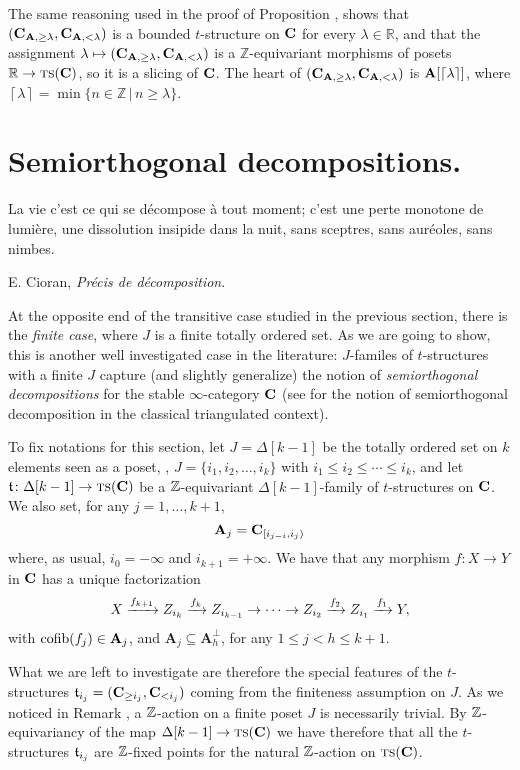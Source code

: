 \begin{remark}The same reasoning used in the proof of Proposition , shows that $(\textbf{C}_{\textbf{A},\geq \lambda}, \textbf{C}_{\textbf{A},<\lambda})$ is a bounded $t$-structure on $\textbf{C}$ for every $\lambda\in \mathbb{R}$, and that the assignment $\lambda\mapsto (\textbf{C}_{\textbf{A},\geq \lambda}, \textbf{C}_{\textbf{A},<\lambda})$ is a $\mathbb{Z}$-equivariant morphisms of posets $\mathbb{R}\to \textsc{ts}(\textbf{C})$, so it is a slicing of $\textbf{C}$. The heart of $(\textbf{C}_{\textbf{A},\geq \lambda}, \textbf{C}_{\textbf{A},<\lambda})$ is $\textbf{A}[\left \lceil{\lambda}\right \rceil]$, where $\left \lceil{\lambda}\right \rceil=\min\{n\in \mathbb{Z}\,|\, n\geq\lambda\}$.
\end{remark}
\section{Semiorthogonal decompositions.}
\setlength{\epigraphwidth}{.75\textwidth}
\epigraph{La vie c'est ce qui se décompose à tout moment; c'est une perte monotone de lumière, une dissolution insipide dans la nuit, sans sceptres, sans auréoles, sans nimbes.}{E. Cioran, \emph{Pr\'ecis de décomposition}.}
\setlength{\epigraphwidth}{\DefaultEpigraphWidth}
At the opposite end of the transitive case studied in the previous section, there is the \emph{finite case}, where $J$ is a finite totally ordered set. As we are going to show, this is another well investigated case in the literature: $J$\hyp{}familes of $t$\hyp{}structures with a finite $J$ capture (and slightly generalize) the notion of \emph{semiorthogonal decompositions} for the stable $\infty$\hyp{}category $\textbf{C}$ (see \cite{Bondal1995, Kuz} for the notion of semiorthogonal decomposition in the classical triangulated context).

To fix notations for this section, let $J=\Delta[k-1]$ be the totally ordered set on $k$ elements seen as a poset, \ie, $J=\{i_1,i_2,\dots,i_k\}$ with $i_1\leq i_2\leq\cdots\leq i_k$, and let $\mathfrak{t}\colon \Delta[k-1]\to \text{\scshape ts}(\textbf{C})$ be a $\mathbb{Z} $\hyp{}equivariant $\Delta[k-1]$\hyp{}family of $t$\hyp{}structures on $\textbf{C}$. We also set, for any $j=1,\dots,k+1$,
\[
\mathbf{A}_j=\textbf{C}_{[i_{j-i}, i_j)}
\]
where, as usual, $i_0=-\infty$ and $i_{k+1}=+\infty$. We have that any morphism $f\colon X\to Y$ in $\textbf{C}$ has a unique factorization
\[
X \xrightarrow{f_{k+1}} Z_{i_k} \xrightarrow{f_k}Z_{i_{k-1}}\to\dots\to Z_{i_{2}} \xrightarrow{f_2} Z_{i_1} \xrightarrow{f_1} Y,
\]
with $\text{cofib}(f_j)\in \mathbf{A}_j$, and $\mathbf{A}_j\subseteq \mathbf{A}_h^\perp$, for any $1\leq j <h\leq k+1$. 

What we are left to investigate are therefore the special features of the $t$\hyp{}structures $\mathfrak{t}_{i_j}=(\textbf{C}_{\geq i_j},\textbf{C}_{< i_j})$ coming from the finiteness assumption on $J$.
As we noticed in Remark , a $\mathbb{Z} $\hyp{}action on a finite poset $J$ is necessarily trivial. By $\mathbb{Z} $\hyp{}equivariancy of the map $\Delta[k-1]\to \text{\scshape ts}(\textbf{C})$ we have therefore that all the $t$\hyp{}structures $\mathfrak{t}_{i_j}$ are $\mathbb{Z} $\hyp{}fixed points for the natural $\mathbb{Z} $\hyp{}action on $ \text{\scshape ts}(\textbf{C})$. 

